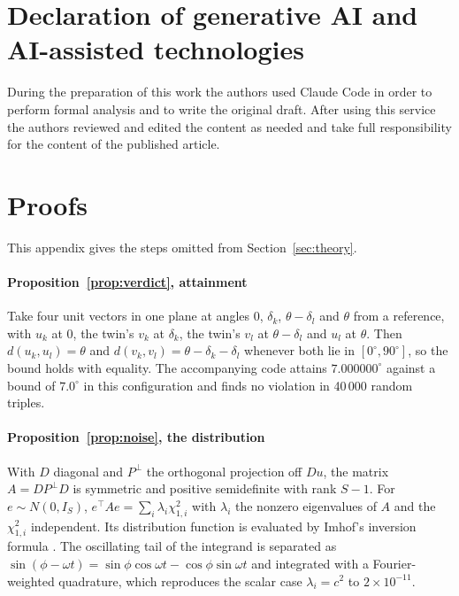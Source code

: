 \documentclass[preprint,12pt]{elsarticle}
\begin{document}
\section*{Declaration of generative AI and AI-assisted technologies}
During the preparation of this work the authors used Claude Code in order to
perform formal analysis and to write the original draft. After using this
service the authors reviewed and edited the content as needed and take full
responsibility for the content of the published article.




\appendix
\section{Proofs}
\label{app:proofs}
This appendix gives the steps omitted from Section~\ref{sec:theory}.

\paragraph{Proposition~\ref{prop:verdict}, attainment}
Take four unit vectors in one plane at angles $0$, $\delta_k$,
$\theta - \delta_l$ and $\theta$ from a reference, with $u_k$ at $0$, the twin's
$v_k$ at $\delta_k$, the twin's $v_l$ at $\theta - \delta_l$ and $u_l$ at
$\theta$. Then $d(u_k,u_l) = \theta$ and $d(v_k,v_l) = \theta - \delta_k -
\delta_l$ whenever both lie in $[0^\circ, 90^\circ]$, so the bound holds with
equality. The accompanying code attains $7.000000^\circ$ against a bound of
$7.0^\circ$ in this configuration and finds no violation in 40\,000 random
triples.

\paragraph{Proposition~\ref{prop:noise}, the distribution}
With $D$ diagonal and $P^\perp$ the orthogonal projection off $Du$, the matrix
$A = D P^\perp D$ is symmetric and positive semidefinite with rank $S-1$. For
$e \sim N(0, I_S)$, $e^\top A e = \sum_i \lambda_i \chi^2_{1,i}$ with
$\lambda_i$ the nonzero eigenvalues of $A$ and the $\chi^2_{1,i}$ independent.
Its distribution function is evaluated by Imhof's inversion formula
\cite{Imhof1961}. The oscillating tail of the integrand is separated as
$\sin(\phi - \omega t) = \sin\phi\cos\omega t - \cos\phi\sin\omega t$ and
integrated with a Fourier-weighted quadrature, which reproduces the scalar case
$\lambda_i = c^2$ to $2\times10^{-11}$.
\end{document}
